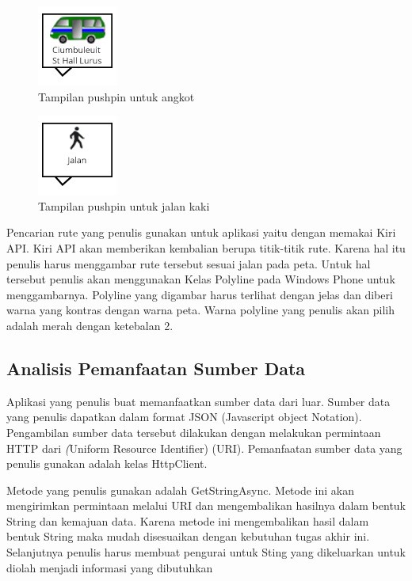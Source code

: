 \begin{figure}[h]
	\centering
		\includegraphics[scale=0.5]{Gambar/out_kiri/angkot}
	\caption{Tampilan pushpin untuk angkot}
	\label{fig:pushpin_angkot}
\end{figure}

\begin{figure}[h]
	\centering
		\includegraphics[scale=0.5]{Gambar/out_kiri/jalan}
	\caption{Tampilan pushpin untuk jalan kaki}
	\label{fig:pushpin_jalan}
\end{figure}

\hspace{0.5cm} Pencarian rute yang penulis gunakan untuk aplikasi yaitu dengan memakai Kiri API. Kiri API akan memberikan kembalian berupa titik-titik rute. Karena hal itu penulis harus menggambar rute tersebut sesuai jalan pada peta. Untuk hal tersebut penulis akan menggunakan Kelas Polyline pada Windows Phone untuk menggambarnya. Polyline yang digambar harus terlihat dengan jelas dan diberi warna yang kontras dengan warna peta. Warna polyline yang penulis akan pilih adalah merah dengan ketebalan 2.

\subsection{Analisis Pemanfaatan Sumber Data}
\label{lab:Analisis Pemanfaatan Sumber Data}
\hspace{0.5cm} Aplikasi yang penulis buat memanfaatkan sumber data dari luar. Sumber data yang penulis dapatkan dalam format JSON (Javascript object Notation). Pengambilan sumber data tersebut dilakukan dengan melakukan permintaan HTTP dari \textit(Uniform Resource Identifier) (URI). Pemanfaatan sumber data yang penulis gunakan adalah kelas HttpClient.

\hspace{0.5cm} Metode yang penulis gunakan adalah GetStringAsync. Metode ini akan mengirimkan permintaan melalui URI dan mengembalikan hasilnya dalam bentuk String dan kemajuan data. Karena metode ini mengembalikan hasil dalam bentuk String maka mudah disesuaikan dengan kebutuhan tugas akhir ini. Selanjutnya penulis harus membuat pengurai untuk Sting yang dikeluarkan untuk diolah menjadi informasi yang dibutuhkan   

